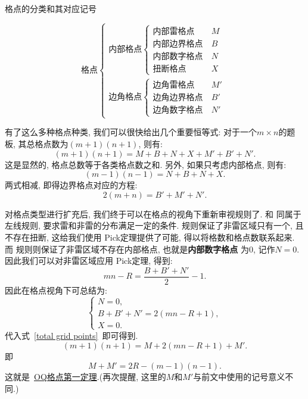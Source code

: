 \documentclass{ctexart}
\newcommand{\varible}[1]{{\Noto[#1]}}
\begin{document}
\begin{table}
    \caption{格点的分类和其对应记号}
    \label{gridpoint types}
    $$
    \text{格点}
    \begin{cases}
        \text{内部格点}
        \begin{cases}
            \text{内部雷格点}\ &M\\
            \text{内部边界格点}\ &B\\
            \text{内部数字格点}\ &N\\
            \text{扭断格点}\ &X
        \end{cases}\\
        \text{边角格点}
        \begin{cases}
            \text{边角雷格点}\ &M'\\
            \text{边角边界格点}\ &B'\\
            \text{边角数字格点}\ &N'
        \end{cases}
    \end{cases}
    $$
\end{table}

有了这么多种格点种类, 我们可以很快给出几个重要恒等式: 对于一个$m\times n$的题板, 其总格点数为$(m+1)(n+1)$, 则有:
\begin{equation}
    \label{total grid points}
    (m+1)(n+1) = M + B + N + X +M' + B' + N'.
\end{equation}
这是显然的, 格点总数等于各类格点数之和.
另外, 如果只考虑内部格点, 则有:
\begin{equation}
    \label{internal grid points}
    (m-1)(n-1) = N + B + N + X.
\end{equation}
两式相减, 即得边界格点对应的方程:
\begin{equation}
    \label{boundary grid points}
    2(m+n) = B' + M' + N'.
\end{equation}

对格点类型进行扩充后, 我们终于可以在格点的视角下重新审视\varible{O}\varible{Q}规则了. \varible{O} 和\varible{Q} 同属于左线规则, 要求雷和非雷的分布满足一定的条件. 规则\varible{O}保证了非雷区域只有一个, 且不存在扭断, 这给我们使用 Pick定理提供了可能, 得以将格数和格点数联系起来. 而\varible{Q} 规则则保证了非雷区域不存在内部格点, 也就是\textbf{内部数字格点} 为0, 记作$N = 0$. 因此我们可以对非雷区域应用 Pick定理, 得到:
\begin{equation}
    \label{pick in OQ}
    mn - R = \frac{B + B' + N'}{2} - 1.
\end{equation}
因此\varible{O}\varible{Q}在格点视角下可总结为:
$$
\begin{cases}
    N = 0,\\
    B + B' + N' = 2(mn - R + 1),\\
    X = 0.
\end{cases}
$$
代入式\ \ref{total grid points}\ 即可得到.
\begin{equation}
    (m+1)(n+1) = M + 2(mn - R + 1) + M'.
\end{equation}
即
\begin{equation}
    M + M' = 2R - (m-1)(n-1).
\end{equation}
这就是\ \hyperref[OQ1]{OQ格点第一定理}.(再次提醒, 这里的$M$和$M'$与前文中使用的记号意义不同.)
\end{document}
